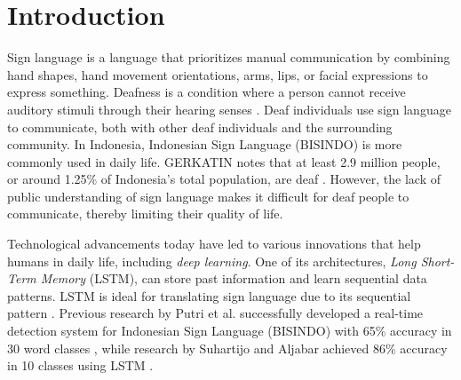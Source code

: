 \section{Introduction}
\label{sec:introduction}




Sign language is a language that prioritizes manual communication by combining hand shapes, hand movement orientations, arms, lips, or facial expressions to express something. Deafness is a condition where a person cannot receive auditory stimuli through their hearing senses \cite{maulida2017}. Deaf individuals use sign language to communicate, both with other deaf individuals and the surrounding community. In Indonesia, Indonesian Sign Language (BISINDO) is more commonly used in daily life. GERKATIN notes that at least 2.9 million people, or around 1.25\% of Indonesia's total population, are deaf \cite{evitasari2015}. However, the lack of public understanding of sign language makes it difficult for deaf people to communicate, thereby limiting their quality of life.

Technological advancements today have led to various innovations that help humans in daily life, including \emph{deep learning}. One of its architectures, \emph{Long Short-Term Memory} (LSTM), can store past information and learn sequential data patterns. LSTM is ideal for translating sign language due to its sequential pattern \cite{sadli2020}. Previous research by Putri et al. successfully developed a real-time detection system for Indonesian Sign Language (BISINDO) with 65\% accuracy in 30 word classes \cite{putri2022}, while research by Suhartijo and Aljabar achieved 86\% accuracy in 10 classes using LSTM \cite{aljabar2020}.

